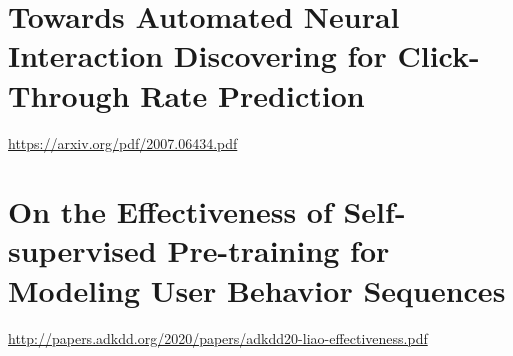 \begin{bibunit}[plainnat]



\chapter{Towards Automated Neural Interaction Discovering for Click-Through Rate Prediction}
\url{https://arxiv.org/pdf/2007.06434.pdf}

\chapter{On the Effectiveness of Self-supervised Pre-training for Modeling User Behavior Sequences}
\url{http://papers.adkdd.org/2020/papers/adkdd20-liao-effectiveness.pdf}



\end{bibunit}
